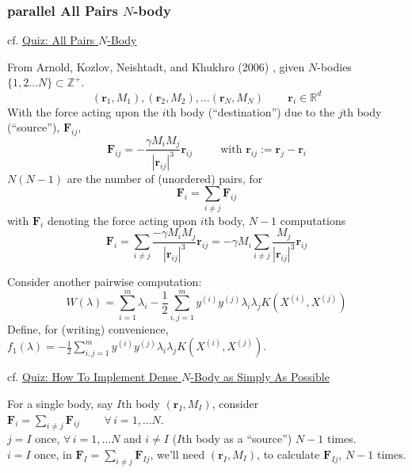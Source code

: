 \documentclass[10pt]{amsart}
\begin{document}
\begin{multicols*}{2}
\subsubsection{parallel All Pairs $N$-body}

cf. \href{https://classroom.udacity.com/courses/cs344/lessons/116611037/concepts/1198442170923#}{Quiz: All Pairs $N$-Body}

From Arnold, Kozlov, Neishtadt, and Khukhro (2006) \cite{AKNK2006}, given $N$-bodies $\lbrace 1,2 \dots N\rbrace \subset \mathbb{Z}^+$.
\[
(\mathbf{r}_1, M_1), (\mathbf{r}_2, M_2), \dots (\mathbf{r}_N, M_N) \qquad \, \mathbf{r}_i \in \mathbb{R}^d
\]
With the force acting upon the $i$th body (``destination'') due to the $j$th body (``source''), $\mathbf{F}_{ij}$,
\begin{equation}
  \mathbf{F}_{ij} = - \frac{\gamma M_i M_j}{ |\mathbf{r}_{ij} |^3 } \mathbf{r}_{ij} \qquad \, \text{ with } \mathbf{r}_{ij} := \mathbf{r}_j - \mathbf{r}_i
\end{equation}
$N(N-1)$ are the number of (unordered) pairs, for
\begin{equation}
\mathbf{F}_i = \sum_{i\neq j} \mathbf{F}_{ij}
\end{equation}
with $\mathbf{F}_i$ denoting the force acting upon $i$th body, $N-1$ computations
\begin{equation}
\mathbf{F}_i =\sum_{i\neq j} \frac{- \gamma M_i M_j }{ |\mathbf{r}_{ij} |^3 } \mathbf{r}_{ij} = -\gamma M_i \sum_{i\neq j} \frac{ M_j}{ |\mathbf{r}_{ij} |^3 } \mathbf{r}_{ij}
\end{equation}

Consider another pairwise computation:
\begin{equation}
  W(\lambda) = \sum_{i=1}^m \lambda_i - \frac{1}{2} \sum_{i,j=1}^m y^{(i)} y^{(j)} \lambda_i\lambda_j K(X^{(i)}, X^{(j)})
\end{equation}
Define, for (writing) convenience,$f_1(\lambda) = -\frac{1}{2} \sum_{i,j=1}^m y^{(i)} y^{(j)} \lambda_i\lambda_j K(X^{(i)}, X^{(j)})$.  









cf. \href{https://classroom.udacity.com/courses/cs344/lessons/116611037/concepts/1198442170923#}{Quiz: How To Implement Dense $N$-Body as Simply As Possible}

For a single body, say $I$th body $(\mathbf{r}_I, M_I)$, consider $\mathbf{F}_i =\sum_{i\neq j} \mathbf{F}_{ij} \qquad \, \forall \, i = 1, \dots N$.  \\
$j=I$ once, $\forall \, i = 1, \dots N$ and $i\neq I$ ($I$th body as a ``source'') $N-1$ times.  \\
$i=I$ once, in $\mathbf{F}_I=\sum_{i\neq j} \mathbf{F}_{Ij}$, we'll need $(\mathbf{r}_I, M_I)$, to calculate $\mathbf{F}_{Ij}$, $N-1$ times.


\end{multicols*}
\end{document}

